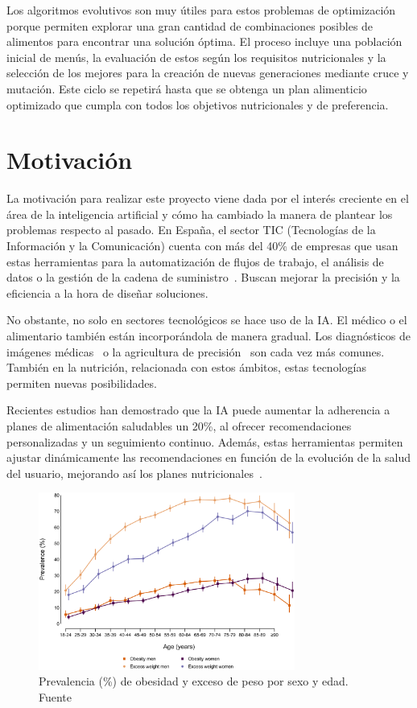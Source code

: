 Los algoritmos evolutivos son muy útiles para estos problemas de optimización porque permiten explorar una gran cantidad de combinaciones posibles de alimentos para encontrar una solución óptima. El proceso incluye una población inicial de menús, la evaluación de estos según los requisitos nutricionales y la selección de los mejores para la creación de nuevas generaciones mediante cruce y mutación. Este ciclo se repetirá hasta que se obtenga un plan alimenticio optimizado que cumpla con todos los objetivos nutricionales y de preferencia.

\section{Motivación}

La motivación para realizar este proyecto viene dada por el interés creciente en el área de la inteligencia artificial y cómo ha cambiado la manera de plantear los problemas respecto al pasado. En España, el sector TIC (Tecnologías de la Información y la Comunicación) cuenta con más del 40\% de empresas que usan estas herramientas para la automatización de flujos de trabajo, el análisis de datos o la gestión de la cadena de suministro~\cite{ontsi2023}. Buscan mejorar la precisión y la eficiencia a la hora de diseñar soluciones.

No obstante, no solo en sectores tecnológicos se hace uso de la IA. El médico o el alimentario también están incorporándola de manera gradual. Los diagnósticos de imágenes médicas~\cite{philips2024} o la agricultura de precisión~\cite{majeed2024} son cada vez más comunes. También en la nutrición, relacionada con estos ámbitos, estas tecnologías permiten nuevas posibilidades.

Recientes estudios han demostrado que la IA puede aumentar la adherencia a planes de alimentación saludables un 20\%, al ofrecer recomendaciones personalizadas y un seguimiento continuo. Además, estas herramientas permiten ajustar dinámicamente las recomendaciones en función de la evolución de la salud del usuario, mejorando así los planes nutricionales~\cite{oh2021systematic}.

\begin{figure}[H]
    \centering
    \includegraphics[width=0.75\textwidth]{figures/prevalencia-obesidad.png}
    \caption{Prevalencia (\%) de obesidad y exceso de peso por sexo y edad. Fuente \cite{ene-covid}}
    \label{fig:prevalencia-obesidad}
\end{figure}


